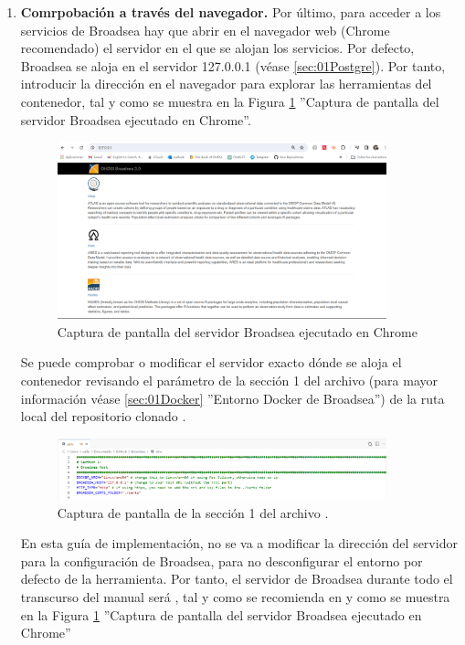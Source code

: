 \begin{enumerate}[label=\alph*]
    \item \textbf{Comrpobación a través del navegador.} Por último, para acceder a los servicios de Broadsea hay que abrir en el navegador web (Chrome recomendado) el servidor en el que se alojan los servicios. Por defecto, Broadsea se aloja en el servidor 127.0.0.1 (véase \ref{sec:01Postgre}).  Por tanto, introducir la dirección en el navegador para explorar las herramientas del contenedor, tal y como se muestra en la Figura \ref{fig:broadseaCap} ''Captura de pantalla del servidor Broadsea ejecutado en Chrome''.

    \begin{figure}[H]
    \centering
    \includegraphics[width=0.90\textwidth]{figures/broadseaCap.png}
     \caption{Captura de pantalla del servidor Broadsea ejecutado en Chrome}
    \label{fig:broadseaCap}
\end{figure}
    
    Se puede comprobar o modificar el servidor exacto dónde se aloja el contenedor revisando el parámetro  de la sección 1 del archivo  (para mayor información véase \ref{sec:01Docker} ''Entorno Docker de Broadsea'') de la ruta local del repositorio clonado . 

\begin{figure}[H]
    \centering
    \includegraphics[width=0.90\textwidth]{figures/seccion1env.png}
    \caption{Captura de pantalla de la sección 1 del archivo .}
    \label{fig:seccion1env}    
\end{figure}

    En esta guía de implementación, no se va a modificar la dirección del servidor para la configuración de Broadsea, para no desconfigurar el entorno por defecto de la herramienta. Por tanto, el servidor de Broadsea durante todo el transcurso del manual será , tal y como se recomienda en \cite{githubBroadseaDB} y como se muestra en la Figura \ref{fig:broadseaCap} ''Captura de pantalla del servidor Broadsea ejecutado en Chrome''

\end{enumerate}

